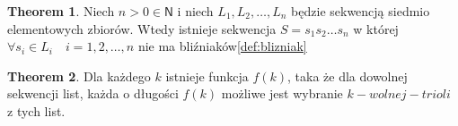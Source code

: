 \documentclass[11pt,a4paper]{article}
\theoremstyle{definition}
\newtheorem{theorem}{Theorem}[section]
\begin{document}
\begin{theorem}
Niech $n > 0 \in \mathsf{N}$ i 
niech $L_1,L_2,\ldots,L_n$ będzie sekwencją 
siedmio elementowych zbiorów. Wtedy istnieje sekwencja $S=s_1s_2\ldots s_n$ w której
$\forall s_i \in L_i \quad i = 1,2,\ldots,n$ nie ma bliźniaków\ref{def:blizniak}
\end{theorem}

\begin{theorem}
Dla każdego $k$ istnieje funkcja $f(k)$, taka że
dla dowolnej sekwencji list, każda o długości $f(k)$
możliwe jest wybranie $k-wolnej-trioli$ z tych list.

\end{theorem}
\end{document}
